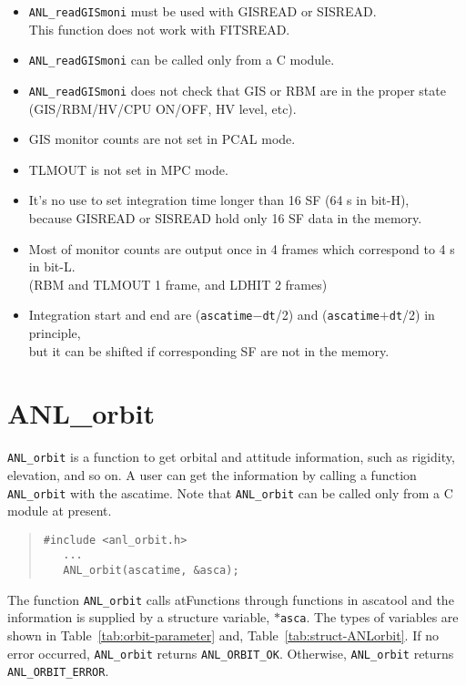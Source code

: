 \begin{itemize}
\item	{\tt ANL\_readGISmoni} must be used with GISREAD or SISREAD.\\
	This function does not work with FITSREAD.
\item	{\tt ANL\_readGISmoni} can be called only from a C module.
\item	{\tt ANL\_readGISmoni} does not check that GIS or RBM are
	in the proper state \\
	(GIS/RBM/HV/CPU ON/OFF, HV level, etc).
\item	GIS monitor counts are not set in PCAL mode.
\item	TLMOUT is not set in MPC mode.
\item	It's no use to set integration time longer than 16 SF
	(64 s in bit-H),\\
	because GISREAD or SISREAD hold only 16 SF data in the memory.
\item	Most of monitor counts are output once in 4 frames
	which correspond to 4 s in bit-L. \\
	(RBM and TLMOUT 1 frame, and LDHIT 2 frames)
\item	Integration start and end are ({\tt ascatime}$-${\tt dt}/2)
	and ({\tt ascatime}$+${\tt dt}/2) in principle,\\
	but it can be shifted if corresponding SF are not in the memory.
\end{itemize}

\section{ANL\_orbit}\label{sec:ANL_orbit}
{\tt ANL\_orbit} is a function
to get orbital and attitude information,
such as rigidity, elevation, and so on.
A user can get the information by calling a function {\tt ANL\_orbit}
with the ascatime.
Note that {\tt ANL\_orbit} can be called only from a C module at present.

\begin{quote}\baselineskip 3.2mm\begin{verbatim}
#include <anl_orbit.h>
   ...
   ANL_orbit(ascatime, &asca);
\end{verbatim}\end{quote}

The function {\tt ANL\_orbit} calls atFunctions through functions in ascatool
and the information is supplied by a structure variable, {\tt $\ast$asca}.
The types of variables are shown in Table~\ref{tab:orbit-parameter}
and, Table~\ref{tab:struct-ANLorbit}.
If no error occurred,
{\tt ANL\_orbit} returns {\tt ANL\_ORBIT\_OK}.
Otherwise,
{\tt ANL\_orbit} returns {\tt ANL\_ORBIT\_ERROR}.

